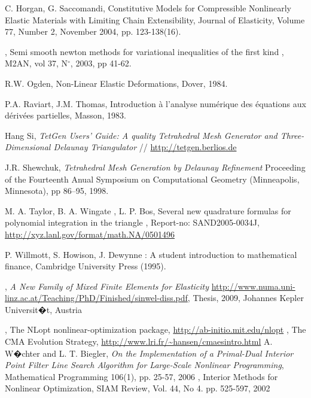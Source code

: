 \documentclass[a4paper,twoside,12pt]{book}
\begin{document}
\begin{thebibliography}{xx}
{\sc C. Horgan, G. Saccomandi}, 
Constitutive Models for Compressible Nonlinearly Elastic Materials with Limiting Chain Extensibility, Journal of Elasticity, Volume 77, Number 2, November 2004, pp. 123-138(16).

,
Semi smooth newton methods for variational inequalities of the first kind ,
M2AN, vol 37, N${}^{\circ}$, 2003, pp 41-62.

{\sc R.W. Ogden}, Non-Linear Elastic Deformations, Dover, 1984.

{\sc P.A. Raviart, J.M. Thomas}, Introduction \`{a} l'analyse num\'{e}rique des
\'{e}quations aux d\'{e}riv\'{e}es partielles, Masson, 1983.

 {\sc Hang Si},
{\it TetGen Users' Guide: A quality Tetrahedral Mesh Generator and Three-Dimensional Delaunay Triangulator} //
 \url{http://tetgen.berlios.de}

 {\sc J.R. Shewchuk},
{\it{Tetrahedral Mesh Generation by Delaunay Refinement}} Proceeding of the Fourteenth Anual Symposium on Computational Geometry (Minneapolis, Minnesota), pp 86--95, 1998.

 {\sc M. A. Taylor,  B. A.
Wingate  , L. P. Bos},  Several new quadrature formulas for polynomial integration in the triangle , Report-no: SAND2005-0034J,
 \url{http://xyz.lanl.gov/format/math.NA/0501496}

  {\sc P. Willmott, S.  Howison, J. Dewynne} :
 A student introduction to mathematical finance, Cambridge University Press (1995).



,  {\it A New Family of Mixed Finite Elements for Elasticity}
\url{http://www.numa.uni-linz.ac.at/Teaching/PhD/Finished/sinwel-diss.pdf}, Thesis,  2009,  Johannes Kepler Universit�t, Austria

, The NLopt nonlinear-optimization package,
\url{http://ab-initio.mit.edu/nlopt}
, The CMA Evolution Strategy,
\url{http://www.lri.fr/~hansen/cmaesintro.html}
 {\sc A. W�chter and L. T. Biegler}, {\it On the Implementation of a Primal-Dual Interior Point Filter Line Search Algorithm for Large-Scale Nonlinear Programming}, Mathematical Programming 106(1), pp. 25-57, 2006
, Interior Methods for Nonlinear Optimization, SIAM Review, Vol. 44, No 4. pp. 525-597, 2002


\end{thebibliography}
\end{document}
